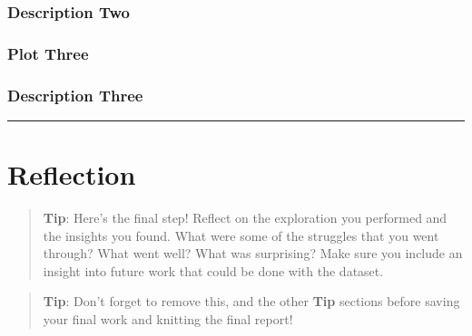 \documentclass[]{article}
\begin{document}
\hypertarget{description-two}{%
\subsubsection{Description Two}\label{description-two}}

\hypertarget{plot-three}{%
\subsubsection{Plot Three}\label{plot-three}}

\hypertarget{description-three}{%
\subsubsection{Description Three}\label{description-three}}

\begin{center}\rule{0.5\linewidth}{\linethickness}\end{center}

\hypertarget{reflection}{%
\section{Reflection}\label{reflection}}

\begin{quote}
\textbf{Tip}: Here's the final step! Reflect on the exploration you
performed and the insights you found. What were some of the struggles
that you went through? What went well? What was surprising? Make sure
you include an insight into future work that could be done with the
dataset.
\end{quote}

\begin{quote}
\textbf{Tip}: Don't forget to remove this, and the other \textbf{Tip}
sections before saving your final work and knitting the final report!
\end{quote}
\end{document}
